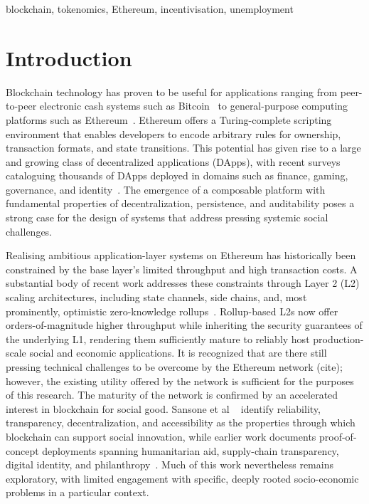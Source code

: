 \documentclass[conference]{IEEEtran}
\begin{document}
\begin{IEEEkeywords}
	blockchain, tokenomics, Ethereum, incentivisation, unemployment
\end{IEEEkeywords}

\section{Introduction}
Blockchain technology has proven to be useful for applications ranging from peer-to-peer electronic cash systems such as Bitcoin~\cite{nakamoto2008bitcoin} to general-purpose computing platforms such as Ethereum~\cite{buterin2014ethereum}. Ethereum offers a Turing-complete scripting environment that enables developers to encode arbitrary rules for ownership, transaction formats, and state transitions. This potential has given rise to a large and growing class of decentralized applications (DApps), with recent surveys cataloguing thousands of DApps deployed in domains such as finance, gaming, governance, and identity~\cite{zheng2023dapp}. The emergence of a composable platform with fundamental properties of decentralization, persistence, and auditability poses a strong case for the design of systems that address pressing systemic social challenges.

Realising ambitious application-layer systems on Ethereum has historically been constrained by the base layer's limited throughput and high transaction costs. A substantial body of recent work addresses these constraints through Layer 2 (L2) scaling architectures, including state channels, side chains, and, most prominently, optimistic zero-knowledge rollups~\cite{sguanci2021layer2,thibault2022rollups}. Rollup-based L2s now offer orders-of-magnitude higher throughput while inheriting the security guarantees of the underlying L1, rendering them sufficiently mature to reliably host production-scale social and economic applications. It is recognized that are there still pressing technical challenges to be overcome by the Ethereum network (cite); however, the existing utility offered by the network is sufficient for the purposes of this research. The maturity of the network is confirmed by an accelerated interest in blockchain for social good. Sansone et al ~\cite{sansone2023blockchain} identify reliability, transparency, decentralization, and accessibility as the properties through which blockchain can support social innovation, while earlier work documents proof-of-concept deployments spanning humanitarian aid, supply-chain transparency, digital identity, and philanthropy~\cite{marino2018blockchain}. Much of this work nevertheless remains exploratory, with limited engagement with specific, deeply rooted socio-economic problems in a particular context.
\end{document}
